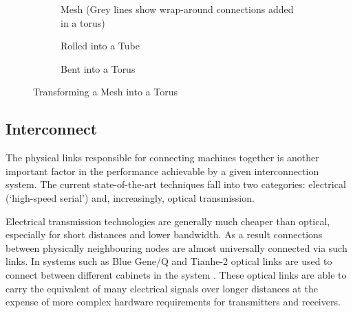 				\begin{figure}
					\begin{subfigure}[t]{\textwidth}
						\center
						
						\caption{Mesh (Grey lines show wrap-around connections added in a torus)}
						\label{fig:torus-flat}
					\end{subfigure}
					
					\vspace{1em}
					
					\begin{subfigure}[t]{\textwidth}
						\center
						
						\caption{Rolled into a Tube}
						\label{fig:torus-pipe}
					\end{subfigure}
					
					\vspace{1em}
					
					\begin{subfigure}[t]{\textwidth}
						\center
						
						\caption{Bent into a Torus}
						\label{fig:torus-3D}
					\end{subfigure}
					
					\caption{Transforming a Mesh into a Torus}
					\label{fig:forming-a-torus}
				\end{figure}
		
		\subsection{Interconnect}
			
			
			The physical links responsible for connecting machines together is another
			important factor in the performance achievable by a given interconnection
			system. The current state-of-the-art techniques fall into two categories:
			electrical (`high-speed serial') and, increasingly, optical transmission.
			
			Electrical transmission technologies are generally much cheaper than
			optical, especially for short distances and lower bandwidth. As a result
			connections between physically neighbouring nodes are almost universally
			connected via such links. In systems such as Blue Gene/Q and Tianhe-2
			optical links are used to connect between different cabinets in the system
			\cite{dongarra13,prickett10}. These optical links are able to carry the
			equivalent of many electrical signals over longer distances at the expense
			of more complex hardware requirements for transmitters and receivers.
			
